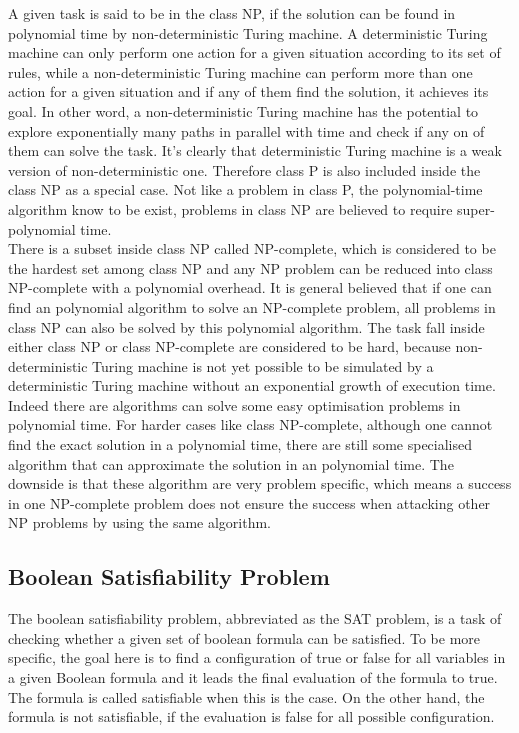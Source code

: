 \documentclass[twoside,a4paper,article]{combine}
\begin{document}
A given task is said to be in the class NP, if the solution can be found in polynomial time by non-deterministic Turing machine. A deterministic Turing machine can only perform one action for a given situation according to its set of rules, while a non-deterministic Turing machine can perform more than one action for a given situation and if any of them find the solution, it achieves its goal. In other word, a non-deterministic Turing machine has the potential to explore exponentially many paths in parallel with time and check if any on of them can solve the task. It's clearly that deterministic Turing machine is a weak version of non-deterministic one. Therefore class P is also included inside the class NP as a special case. Not like a problem in class P, the polynomial-time algorithm know to be exist, problems in class NP are believed to require super-polynomial time. \\

There is a subset inside class NP called NP-complete, which is considered to be the hardest set among class NP and any NP problem can be reduced into class NP-complete with a polynomial overhead. It is general believed that if one can find an polynomial algorithm to solve an NP-complete problem, all problems in class NP can also be solved by this polynomial algorithm.  The task fall inside either class NP or class NP-complete are considered to be hard, because non-deterministic Turing machine is not yet possible to be simulated by a deterministic Turing machine without an exponential growth of execution time. \\ 

Indeed there are algorithms can solve some easy optimisation problems in polynomial time. For harder cases like class NP-complete, although one cannot find the exact solution in a polynomial time, there are still some specialised algorithm that can approximate the solution in an polynomial time. The downside is that these algorithm are very problem specific, which means a success in one NP-complete problem does not ensure the success when attacking other NP problems by using the same algorithm. \\

\subsection{Boolean Satisfiability Problem}

The boolean satisfiability problem, abbreviated as the SAT problem, is a task of checking whether a given set of boolean formula can be satisfied. To be more specific, the goal here is to find a configuration of true or false for all variables in a given Boolean formula and it leads the final evaluation of the formula to true. The formula is called satisfiable when this is the case. On the other hand, the formula is not satisfiable, if the evaluation is false for all possible configuration.  \\
\end{document}
